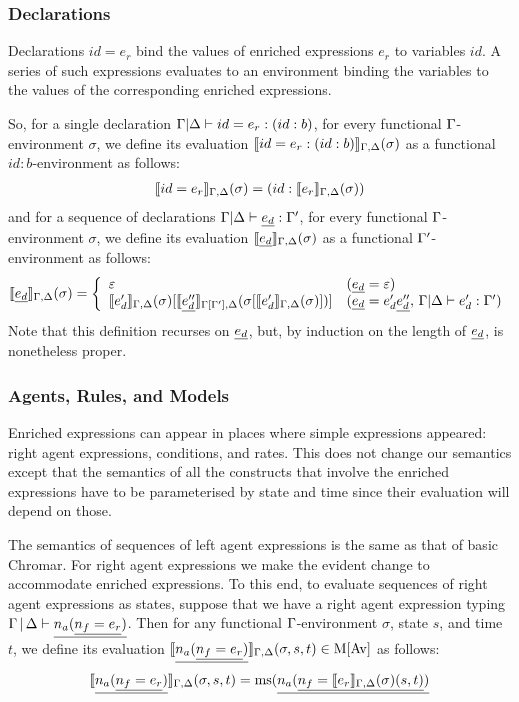 \subsubsection*{Declarations}
Declarations $id = e_r$ bind the values of enriched expressions $e_r$ to variables
$id$.  A series of such expressions evaluates to an environment binding the
variables to the values of the corresponding enriched
expressions.

So, for a single declaration $\Gamma | \Delta \vdash id = e_r: (id:b)$, for every functional
$\Gamma$-environment $\sigma$, we define its evaluation
$\llbracket id = e_r: (id:b) \rrbracket_{\Gamma ,\Delta}(\sigma)$ as a functional $id:b$-environment as follows:
%
\begin{align*}
\llbracket id = e_r \rrbracket_{\Gamma,\Delta}(\sigma) = (id : \llbracket e_r \rrbracket_{\Gamma,\Delta}(\sigma))
\end{align*}
%
and for a sequence of declarations $\Gamma | \Delta \vdash \underline{e_d}:\Gamma'$, for every functional
$\Gamma$-environment $\sigma$, we define its evaluation
$\llbracket \underline{e_d} \rrbracket_{\Gamma , \Delta}(\sigma)$ as a functional $\Gamma'$-environment as follows:
%
\[\llbracket \underline{e_d} \rrbracket_{\Gamma , \Delta}(\sigma) = 
\left \{\begin{array}{ll}
 \varepsilon & (\underline{e_d} = \varepsilon)   \\
\llbracket e'_d \rrbracket_{\Gamma,\Delta}(\sigma) [ \llbracket \underline{e''_d} \rrbracket_{\Gamma[\Gamma'],\Delta} (\sigma[\llbracket e'_d \rrbracket_{\Gamma,\Delta}(\sigma)]) ] & (\underline{e_d} = e'_d \underline{e''_d},\, \Gamma|\Delta \vdash e'_d: \Gamma') 
\end{array}\right .\]
%
Note that this definition recurses on $\underline{e_d}$, but, by induction on the length
of $\underline{e_d}$, is nonetheless proper.


\subsubsection*{Agents, Rules, and Models}  
Enriched expressions can appear in places where simple expressions appeared:
right agent expressions, conditions, and rates. This does not change our
semantics except that the semantics of all the constructs that involve the
enriched expressions have to be parameterised by state and time since their
evaluation will depend on those.

The semantics of sequences of left agent expressions is the same as that of
basic Chromar. For right agent expressions we make the evident change to
accommodate enriched expressions. To this end, to evaluate sequences of right
agent expressions as states, %
suppose that we have a right agent expression typing
$\Gamma \,|\, \Delta \vdash \underline{n_a(\underline{n_f = e_r})}$. Then for any functional
$\Gamma$-environment $\sigma$, state $s$, and time $t$, we define its evaluation
$\llbracket \underline{n_a(\underline{n_f = e_r})} \rrbracket_{\Gamma,\Delta}(\sigma,s,t) \in \mathrm{M}[\mathrm{Av}]$ as follows:
\begin{align*}
\llbracket \underline{n_a(\underline{n_f = e_r})} \rrbracket_{\Gamma,\Delta}(\sigma,s,t) = \mathrm{ms}(\underline{n_a(\underline{n_f = \llbracket e_r \rrbracket_{\Gamma,\Delta}(\sigma)(s,t)})}
\end{align*}

